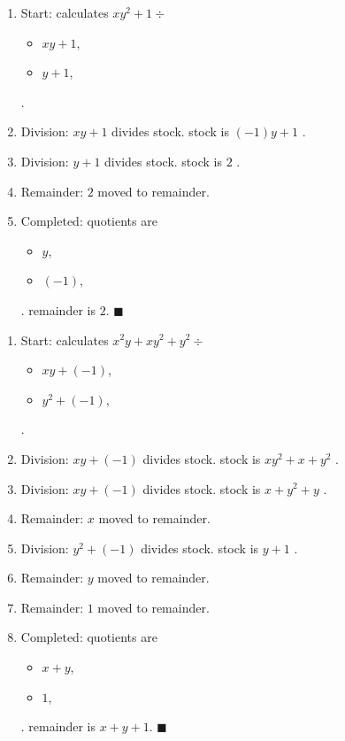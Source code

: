 \documentclass{jsarticle}
\begin{document}
\begin{enumerate}
\item Start: calculates $xy^2+1\div $\begin{itemize}
\item $xy+1$, 
\item $y+1$, 
\end{itemize} .  

\item Division: $xy+1$ divides stock. stock is $(-1)y+1$ .  
\item Division: $y+1$ divides stock. stock is $2$ .  
\item Remainder: $2$ moved to remainder.  
\item Completed: quotients are \begin{itemize}
\item $y$, 
\item $(-1)$, 
\end{itemize} .  
remainder is $2$.  $\blacksquare$
\end{enumerate}
\newpage{}\begin{enumerate}
\item Start: calculates $x^2y+xy^2+y^2\div $\begin{itemize}
\item $xy+(-1)$, 
\item $y^2+(-1)$, 
\end{itemize} .  

\item Division: $xy+(-1)$ divides stock. stock is $xy^2+x+y^2$ .  
\item Division: $xy+(-1)$ divides stock. stock is $x+y^2+y$ .  
\item Remainder: $x$ moved to remainder.  
\item Division: $y^2+(-1)$ divides stock. stock is $y+1$ .  
\item Remainder: $y$ moved to remainder.  
\item Remainder: $1$ moved to remainder.  
\item Completed: quotients are \begin{itemize}
\item $x+y$, 
\item $1$, 
\end{itemize} .  
remainder is $x+y+1$.  $\blacksquare$
\end{enumerate}
\end{document}
